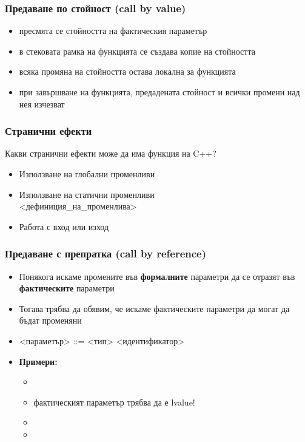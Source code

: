 \documentclass[alsotrans]{beamerswitch}
\begin{document}
\begin{frame}
  \frametitle{Предаване по стойност (call by value)}

  \begin{itemize}[<+->]
  \item пресмята се стойността на фактическия параметър
  \item в стековата рамка на функцията се създава \alert{копие} на стойността
  \item всяка промяна на стойността остава локална за функцията
  \item при завършване на функцията, предадената стойност и всички промени над нея \alert{изчезват}
  \end{itemize}
\end{frame}

\begin{frame}
  \frametitle{Странични ефекти}

  Какви странични ефекти може да има функция на C++?\\[1em]
  \pause
  \begin{itemize}[<+->]
  \item Използване на глобални променливи
  \item Използване на статични променливи\\
     <дефиниция\_на\_променлива>
  \item Работа с вход или изход
  \end{itemize}
\end{frame}

\begin{frame}
  \frametitle{Предаване с препратка (call by reference)}

  \begin{itemize}[<+->]
  \item Понякога искаме промените във \textbf{формалните} параметри
    да се отразят във \textbf{фактическите} параметри
  \item Тогава трябва да обявим, че искаме фактическите параметри да могат да бъдат променяни
  \item{} <параметър> ::= <тип>\tta{\&} <идентификатор>
  \item \textbf{Примери:}
    \begin{itemize}
    \item {}
    \item \alert{фактическият параметър трябва да е lvalue!}
    \item {}
    \item {}
    \end{itemize}
  \end{itemize}
\end{frame}
\end{document}

